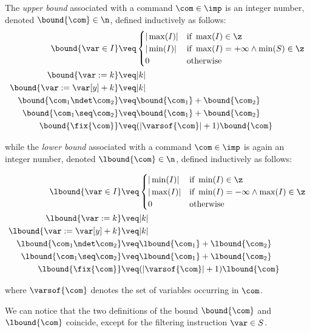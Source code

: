 \begin{definition}\label{def:bound}
  The \emph{upper bound} associated with a command \(\com\in \imp\) is
  an integer number, denoted \(\bound{\com}\in \n\), defined
  inductively as follows:
  \begin{align*}
    \bound{\var \in I}  
    & \veq \begin{cases}
      |\max(I)| & \text{if } \max(I)\in\z \\
      |\min(I)| & \text{if } \max(I)=+\infty \land \min(S)\in\z\\
      0 & \text{otherwise}
    \end{cases}
    \\
    \bound{\var := k} 
    & \veq | k |\\
    \bound{\var := \var[y] + k}
    & \veq | k |\\
    \bound{\com_1 \ndet \com_2}
    & \veq \bound{\com_1} + \bound{\com_2}\\
    \bound{\com_1 \seq \com_2}
    & \veq \bound{\com_1} + \bound{\com_2}\\
    \bound{\fix{\com}}
    & \veq (|\varsof{\com}|+1) \bound{\com} \\ 
  \end{align*}

  while the \emph{lower bound} associated with a command
  \(\com\in \imp\) is again an integer number, denoted
  \(\lbound{\com}\in \n\), defined inductively as follows:

  \begin{align*}
    \lbound{\var \in I}  
    & \veq \begin{cases}
      |\min(I)| & \text{if } \min(I)\in \z \\
      |\max(I)| & \text{if } \min(I)=-\infty \land \max(I)\in\z \\
      0 & \text{otherwise}
    \end{cases}
    \\
    \lbound{\var := k} 
    & \veq | k |\\
    \lbound{\var := \var[y] + k}
    & \veq | k |\\
    \lbound{\com_1 \ndet \com_2}
    & \veq \lbound{\com_1} + \lbound{\com_2}\\
    \lbound{\com_1 \seq \com_2}
    & \veq \lbound{\com_1} + \lbound{\com_2}\\
    \lbound{\fix{\com}}
    & \veq (|\varsof{\com}|+1) \lbound{\com} \\ 
  \end{align*}

  where \(\varsof{\com}\) denotes the set of variables occurring in 
  \(\com\).
\end{definition}

We can notice that the two definitions of the bound \(\bound{\com}\)
and \(\lbound{\com}\) coincide, except for the filtering instruction
\(\var\in S\).
